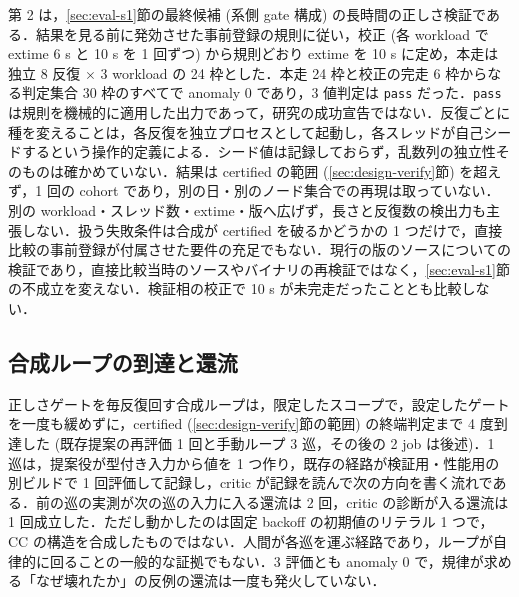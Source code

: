 \documentclass[submit,techrep,noauthor]{ipsj}
\begin{document}
第 2 は，\ref{sec:eval-s1}節の最終候補 (系側 gate 構成) の長時間の正しさ検証である．結果を見る前に発効させた事前登録の規則に従い，校正 (各 workload で extime 6 s と 10 s を 1 回ずつ) から規則どおり extime を 10 s に定め，本走は独立 8 反復 $\times$ 3 workload の 24 枠とした．本走 24 枠と校正の完走 6 枠からなる判定集合 30 枠のすべてで anomaly 0 であり，3 値判定は \texttt{pass} だった．\texttt{pass} は規則を機械的に適用した出力であって，研究の成功宣告ではない．反復ごとに種を変えることは，各反復を独立プロセスとして起動し，各スレッドが自己シードするという操作的定義による．シード値は記録しておらず，乱数列の独立性そのものは確かめていない．結果は certified の範囲 (\ref{sec:design-verify}節) を超えず，1 回の cohort であり，別の日・別のノード集合での再現は取っていない．別の workload・スレッド数・extime・版へ広げず，長さと反復数の検出力も主張しない．扱う失敗条件は合成が certified を破るかどうかの 1 つだけで，直接比較の事前登録が付属させた要件の充足でもない．現行の版のソースについての検証であり，直接比較当時のソースやバイナリの再検証ではなく，\ref{sec:eval-s1}節の不成立を変えない．検証相の校正で 10 s が未完走だったこととも比較しない．

\subsection{合成ループの到達と還流}
\label{sec:eval-loop}

正しさゲートを毎反復回す合成ループは，限定したスコープで，設定したゲートを一度も緩めずに，certified (\ref{sec:design-verify}節の範囲) の終端判定まで 4 度到達した (既存提案の再評価 1 回と手動ループ 3 巡，その後の 2 job は後述)．1 巡は，提案役が型付き入力から値を 1 つ作り，既存の経路が検証用・性能用の別ビルドで 1 回評価して記録し，critic が記録を読んで次の方向を書く流れである．前の巡の実測が次の巡の入力に入る還流は 2 回，critic の診断が入る還流は 1 回成立した．ただし動かしたのは固定 backoff の初期値のリテラル 1 つで，CC の構造を合成したものではない．人間が各巡を運ぶ経路であり，ループが自律的に回ることの一般的な証拠でもない．3 評価とも anomaly 0 で，規律が求める「なぜ壊れたか」の反例の還流は一度も発火していない．
\end{document}

